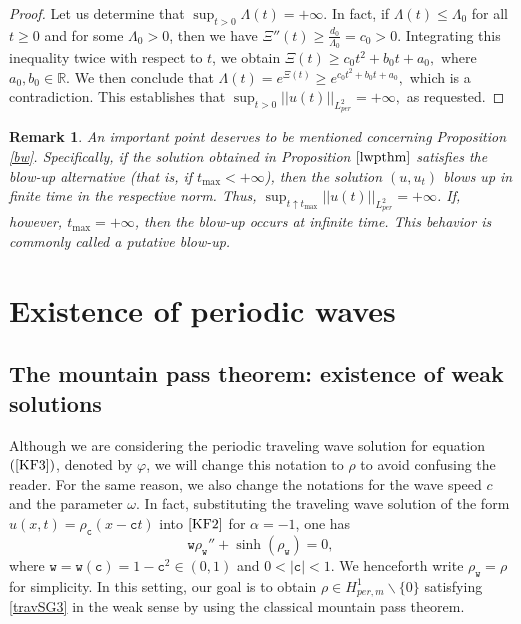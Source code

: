 \documentclass[12pt,reqno,a4paper]{amsart} %
\numberwithin{equation}{section}
\numberwithin{figure}{section}
\newtheorem{remark}[theorem]{Remark}
\begin{document}
\begin{proof}
		\indent Let us determine that $\displaystyle\sup_{t>0} \Lambda (t)=+\infty$. In fact, if $\Lambda(t) \leq \Lambda_0$ for all $t\ge0$ and for some $\Lambda_0>0$, then we have $\Xi''(t)\ge \frac{ d_0}{\Lambda_0}=c_0>0$. Integrating this inequality twice with respect to $t$, we obtain
		$		\Xi(t)\ge c_0t^2+b_0t+a_0,$ where $a_0,b_0\in \mathbb{R}.
		$	
		We then conclude that
			$\Lambda(t)= e^{\Xi(t)}\ge e^{ c_0t^2+b_0t+a_0},
		$
		which is a contradiction. This establishes that $\displaystyle\sup_{t>0}||u(t)||_{L_{per}^2}=+\infty,$ as requested.
\end{proof}

  \begin{remark} An important point deserves to be mentioned concerning Proposition \ref{bw}. Specifically, if the solution obtained in Proposition $\ref{lwpthm}$ satisfies the blow-up alternative (that is, if $t_{\max}<+\infty$), then the solution $(u,u_t)$ blows up in finite time in the respective norm. Thus,  $\displaystyle\sup_{t \uparrow t_{\max}} ||u(t)||_{L_{per}^2} = +\infty$. If, however, $t_{\max}=+\infty$, then the blow-up occurs at infinite time. This behavior is commonly called a putative blow-up.
    \end{remark}
 
 
 \section{Existence of periodic waves}\label{section4} 
 
 \subsection{The mountain pass theorem: existence of weak solutions }
 
 
 Although we are considering the periodic traveling wave solution for equation $(\ref{KF3})$, denoted by $\varphi$, we will change this notation to $\rho$ to avoid confusing the reader. For the same reason, we also change the notations for the wave speed $c$ and the parameter $\omega$. In fact, substituting the traveling wave solution of the form $u(x,t)=\rho_\mathtt{c}(x-\mathtt{c}t)$ into $\eqref{KF2}$ for $\alpha=-1$, one has \begin{equation}\label{travSG3}
 	\mathtt{w} \rho_\mathtt{w}''+\sinh(\rho_\mathtt{w})=0,
 \end{equation}where $ \mathtt{w} =\mathtt{w}(\mathtt{c})=1-\mathtt{c}^2 \in (0,1)$ and $0<|\mathtt{c}|<1$. We henceforth write $\rho_\mathtt{w}=\rho$ for simplicity. In this setting, our goal is to obtain $\rho \in H^1_{per,m} \backslash  \{0\}$ satisfying \eqref{travSG3} in the weak sense by using the classical mountain pass theorem. 
 
\end{document}
